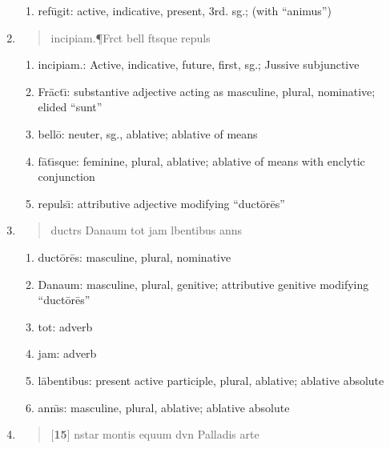 \documentclass[]{article}
\newcommand{\latify}[1]{
        \Large
        \begin{verse}
          \begin{metrica}
          {#1}\\
          \end{metrica}
        \end{verse}
        \normalsize
}
\begin{document}
\begin{enumerate}
\begin{enumerate}
	\item ref\={u}git: active, indicative, present, 3rd. sg.; (with ``animus'')

\end{enumerate}

\item \latify{incipiam.{\P}Fr{}ct{\macron {\i}} bell{\macron {o}} f{\macron {a}}t{\macron {\i}}sque repuls{\macron {\i}}}
\begin{enumerate}

	\item incipiam.:   Active, indicative, future, first, sg.; Jussive subjunctive

	\item Fr\={a}ct\={\i}:  substantive adjective acting as masculine, plural, nominative; elided ``sunt''

	\item bell\={o}:  neuter, sg., ablative; ablative of means

	\item f\={a}t\={\i}sque: feminine, plural, ablative; ablative of means with enclytic conjunction

	\item repuls\={\i}:  attributive adjective modifying ``duct\={o}r\={e}s''

\end{enumerate}

\item \latify{duct{}r{}s Danaum tot jam l{\macron {a}}bentibus ann{\macron {\i}}s}
\begin{enumerate}

	\item duct\={o}r\={e}s:  masculine, plural, nominative

	\item Danaum: masculine, plural, genitive; attributive genitive modifying ``duct\={o}r\={e}s''

	\item tot:  adverb

	\item jam: adverb

	\item l\={a}bentibus: present active participle, plural, ablative; ablative absolute

	\item ann\={\i}s:  masculine, plural, ablative; ablative absolute
\end{enumerate}


\item \latify{[\textbf{15}] {\macron {\i}}nstar montis equum d{\macron {\i}}v{\macron {\i}}n{\macron {a}} Palladis arte}     
\begin{enumerate}


\end{enumerate}
\end{enumerate}
\end{document}
